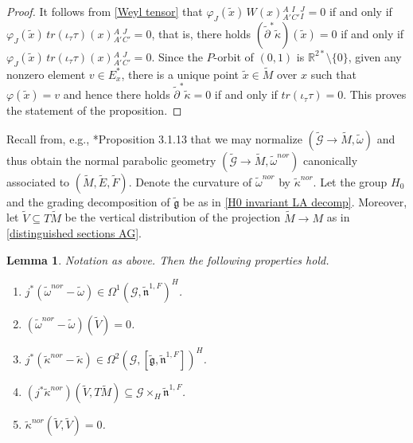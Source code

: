 \documentclass[11pt]{amsart}
\newtheorem{lemma}[proposition]{Lemma}
\begin{document}
\begin{proof}
It follows from \cref{Weyl tensor} that $\varphi_J(\tilde x)\,W(x){}^A_{A'}{}^I_{C'}{}^{J}_{I}=0$ if and only if $\varphi_J(\tilde x)\,tr(\iota_\tau\tau)(x){}^A_{A'}{}^J_{C'}=0$, that is, there holds $(\tilde\partial^*\tilde\kappa)(\tilde x)=0$ if and only if $\varphi_J(\tilde x)\,tr(\iota_\tau\tau)(x){}^A_{A'}{}^J_{C'}=0$. Since the $P$-orbit of $(0,1)$ is $\mathbb R^{2*}\setminus\{0\}$, given any nonzero element $v\in E_x^*$, there is a unique point $\tilde x\in \tilde M$ over $x$ such that $\varphi(\tilde x)=v$ and hence there holds $\tilde\partial^*\tilde\kappa=0$ if and only if $tr(\iota_\tau\tau)=0$. This proves the statement of the proposition.
\end{proof}
Recall from, e.g., \cite{Book}*{Proposition 3.1.13} that we may normalize $(\tilde{\mathcal G}\to\tilde M,\tilde\omega)$ and thus obtain the normal parabolic geometry $(\tilde{\mathcal G}\to\tilde M,\tilde\omega^{nor})$ canonically associated to $(\tilde M,\tilde E,\tilde F)$. Denote the curvature of $\tilde\omega^{nor}$ by $\tilde\kappa^{nor}$. Let the group $H_0$ and the grading decomposition of $\tilde{\mathfrak g}$ be as in \cref{H0 invariant LA decomp}. Moreover, let $\tilde V\subseteq T\tilde M$ be the vertical distribution of the projection $\tilde M\to M$ as in \cref{distinguished sections AG}.
\begin{lemma}\label{normalization}
Notation as above. Then the following properties hold.
\begin{enumerate}
\item [$\bullet$] $j^*(\tilde\omega^{nor}-\tilde\omega)\in\Omega^1(\mathcal G,\tilde{\mathfrak n}^{1,F})^H$.
    \item [$\bullet$] $(\tilde\omega^{nor}-\tilde\omega)(\tilde V)=0$.
    \item [$\bullet$] $j^*(\tilde\kappa^{nor}-\tilde\kappa)\in\Omega^2(\mathcal G,[\tilde{\mathfrak g},\tilde{\mathfrak n}^{1,F}])^H$.
    \item [$\bullet$] $(j^*\tilde\kappa^{nor})(\tilde V,T\tilde M)\subseteq\mathcal G\times_H\tilde{\mathfrak n}^{1,F}$.
    \item [$\bullet$] $\tilde\kappa^{nor}(\tilde V,\tilde V)=0$.
\end{enumerate}   
\end{lemma}
\end{document}
